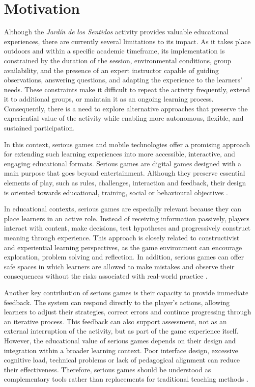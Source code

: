 \section{Motivation}
Although the \textit{Jardín de los Sentidos} activity provides valuable educational experiences, there are currently several limitations to its impact. As it takes place outdoors and within a specific academic timeframe, its implementation is constrained by the duration of the session, environmental conditions, group availability, and the presence of an expert instructor capable of guiding observations, answering questions, and adapting the experience to the learners’ needs. These constraints make it difficult to repeat the activity frequently, extend it to additional groups, or maintain it as an ongoing learning process. Consequently, there is a need to explore alternative approaches that preserve the experiential value of the activity while enabling more autonomous, flexible, and sustained participation.

In this context, serious games and mobile technologies offer a promising approach for extending such learning experiences into more accessible, interactive, and engaging educational formats. Serious games are digital games designed with a main purpose that goes beyond entertainment. Although they preserve essential elements of play, such as rules, challenges, interaction and feedback, their design is oriented towards educational, training, social or behavioural objectives \cite{hands2026serious, facchino2025seriousgames}.

In educational contexts, serious games are especially relevant because they can place learners in an active role. Instead of receiving information passively, players interact with content, make decisions, test hypotheses and progressively construct meaning through experience. This approach is closely related to constructivist and experiential learning perspectives, as the game environment can encourage exploration, problem solving and reflection. In addition, serious games can offer safe spaces in which learners are allowed to make mistakes and observe their consequences without the risks associated with real-world practice \cite{gomez2019mixed, hands2026serious, facchino2025seriousgames}.

Another key contribution of serious games is their capacity to provide immediate feedback. The system can respond directly to the player’s actions, allowing learners to adjust their strategies, correct errors and continue progressing through an iterative process. This feedback can also support assessment, not as an external interruption of the activity, but as part of the game experience itself. However, the educational value of serious games depends on their design and integration within a broader learning context. Poor interface design, excessive cognitive load, technical problems or lack of pedagogical alignment can reduce their effectiveness. Therefore, serious games should be understood as complementary tools rather than replacements for traditional teaching methods \cite{de2014serious, facchino2025seriousgames, hands2026serious}.

